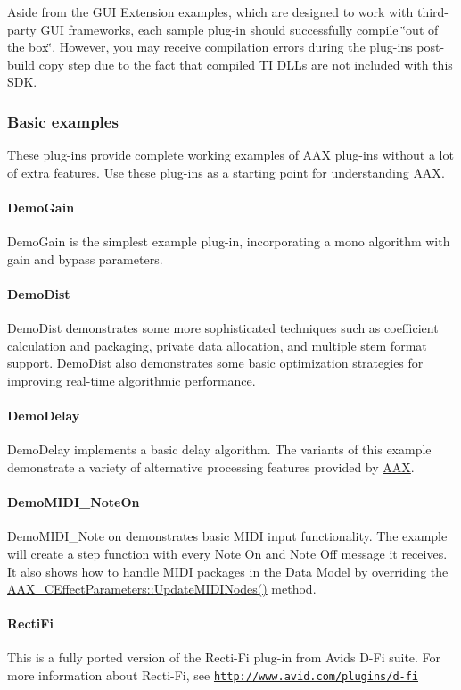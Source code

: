 Aside from the G\+U\+I Extension examples, which are designed to work with third-\/party G\+U\+I frameworks, each sample plug-\/in should successfully compile \char`\"{}out of the box\char`\"{}. However, you may receive compilation errors during the plug-\/ins\textquotesingle{} post-\/build copy step due to the fact that compiled T\+I D\+L\+Ls are not included with this S\+D\+K.\hypertarget{a00376_basic_examples}{}\subsubsection{Basic examples}\label{a00376_basic_examples}
These plug-\/ins provide complete working examples of A\+A\+X plug-\/ins without a lot of extra features. Use these plug-\/ins as a starting point for understanding \hyperlink{a00288}{A\+A\+X}.\hypertarget{a00376_DemoGain}{}\paragraph{Demo\+Gain}\label{a00376_DemoGain}
Demo\+Gain is the simplest example plug-\/in, incorporating a mono algorithm with gain and bypass parameters.\hypertarget{a00376_DemoDist}{}\paragraph{Demo\+Dist}\label{a00376_DemoDist}
Demo\+Dist demonstrates some more sophisticated techniques such as coefficient calculation and packaging, private data allocation, and multiple stem format support. Demo\+Dist also demonstrates some basic optimization strategies for improving real-\/time algorithmic performance.\hypertarget{a00376_DemoDelay}{}\paragraph{Demo\+Delay}\label{a00376_DemoDelay}
Demo\+Delay implements a basic delay algorithm. The variants of this example demonstrate a variety of alternative processing features provided by \hyperlink{a00288}{A\+A\+X}.\hypertarget{a00376_DemoMIDI_NoteOn}{}\paragraph{Demo\+M\+I\+D\+I\+\_\+\+Note\+On}\label{a00376_DemoMIDI_NoteOn}
Demo\+M\+I\+D\+I\+\_\+\+Note on demonstrates basic M\+I\+D\+I input functionality. The example will create a step function with every Note On and Note Off message it receives. It also shows how to handle M\+I\+D\+I packages in the Data Model by overriding the \hyperlink{a00018_a900a8fcf7d2e0bebda33e5ac393019c2}{A\+A\+X\+\_\+\+C\+Effect\+Parameters\+::\+Update\+M\+I\+D\+I\+Nodes()} method.\hypertarget{a00376_RectiFi}{}\paragraph{Recti\+Fi}\label{a00376_RectiFi}
This is a fully ported version of the Recti-\/\+Fi plug-\/in from Avid\textquotesingle{}s D-\/\+Fi suite. For more information about Recti-\/\+Fi, see \href{http://www.avid.com/plugins/d-fi}{\tt http\+://www.\+avid.\+com/plugins/d-\/fi}

